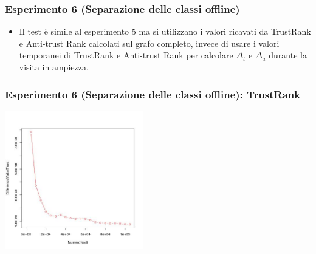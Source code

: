 \documentclass{beamer}
\begin{document}
\begin{frame}
\frametitle{Esperimento 6 {\tiny(Separazione delle classi offline)}}
\begin{itemize}
 \item Il test è simile al esperimento 5 ma si utilizzano i valori ricavati da TrustRank e Anti-trust Rank calcolati sul grafo completo, invece di usare i valori temporanei di TrustRank e Anti-trust Rank per calcolare \(\Delta_t\) e \(\Delta_a\) durante la visita in ampiezza.
 \end{itemize}
\end{frame}
\begin{frame}
\frametitle{Esperimento 6 {\tiny(Separazione delle classi offline)}: TrustRank}
\begin{center}
 \includegraphics[height=6cm]{immagini/test6/averageCompleteTest_trust_62}
\end{center}
\end{frame}
\end{document}

